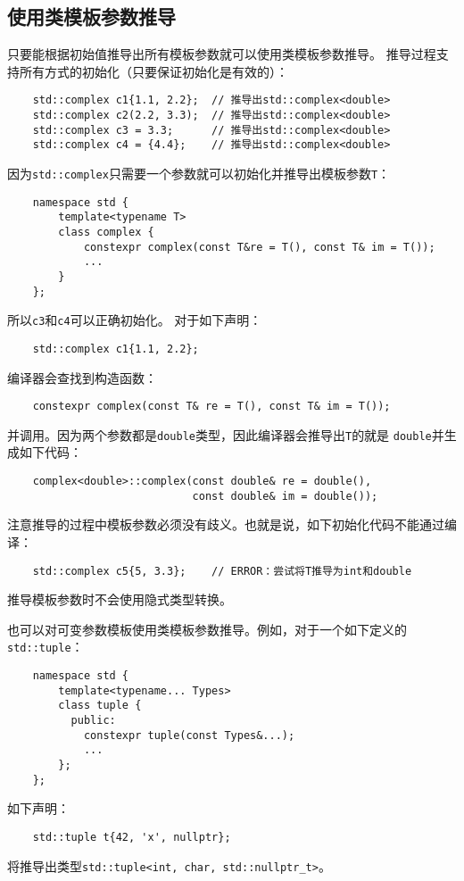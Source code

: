 \subsection{使用类模板参数推导}
只要能根据初始值推导出所有模板参数就可以使用类模板参数推导。
推导过程支持所有方式的初始化（只要保证初始化是有效的）：
\begin{lstlisting}
    std::complex c1{1.1, 2.2};  // 推导出std::complex<double>
    std::complex c2(2.2, 3.3);  // 推导出std::complex<double>
    std::complex c3 = 3.3;      // 推导出std::complex<double>
    std::complex c4 = {4.4};    // 推导出std::complex<double>
\end{lstlisting}
因为\texttt{std::complex}只需要一个参数就可以初始化并推导出模板参数\texttt{T}：
\begin{lstlisting}
    namespace std {
        template<typename T>
        class complex {
            constexpr complex(const T&re = T(), const T& im = T());
            ...
        }
    };
\end{lstlisting}
所以\texttt{c3}和\texttt{c4}可以正确初始化。
对于如下声明：
\begin{lstlisting}
    std::complex c1{1.1, 2.2};
\end{lstlisting}
编译器会查找到构造函数：
\begin{lstlisting}
    constexpr complex(const T& re = T(), const T& im = T());
\end{lstlisting}
并调用。因为两个参数都是\texttt{double}类型，因此编译器会推导出\texttt{T}的就是
\texttt{double}并生成如下代码：
\begin{lstlisting}
    complex<double>::complex(const double& re = double(),
                             const double& im = double());
\end{lstlisting}
注意推导的过程中模板参数必须没有歧义。也就是说，如下初始化代码不能通过编译：
\begin{lstlisting}
    std::complex c5{5, 3.3};    // ERROR：尝试将T推导为int和double
\end{lstlisting}
推导模板参数时不会使用隐式类型转换。

也可以对可变参数模板使用类模板参数推导。例如，对于一个如下定义的\texttt{std::tuple}：
\begin{lstlisting}
    namespace std {
        template<typename... Types>
        class tuple {
          public:
            constexpr tuple(const Types&...);
            ...
        };
    };
\end{lstlisting}
如下声明：
\begin{lstlisting}
    std::tuple t{42, 'x', nullptr};
\end{lstlisting}
将推导出类型\texttt{std::tuple<int, char, std::nullptr\_t>}。

